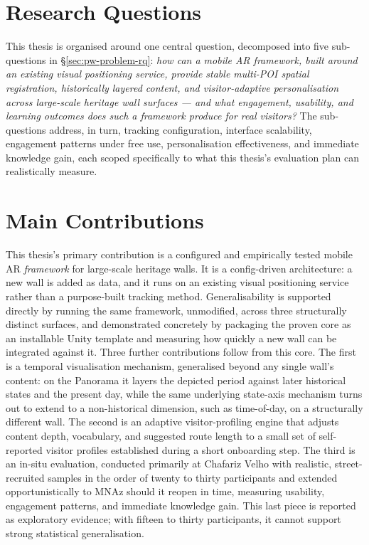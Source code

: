 \section{Research Questions}
\label{sec:intro-rqs}

This thesis is organised around one central question, decomposed into
five sub-questions in \S\ref{sec:pw-problem-rq}: \emph{how can a mobile
AR framework, built around an existing visual positioning service,
provide stable multi-POI spatial registration, historically layered
content, and visitor-adaptive personalisation across large-scale heritage
wall surfaces --- and what engagement, usability, and learning outcomes
does such a framework produce for real visitors?} The sub-questions
address, in turn, tracking configuration, interface scalability,
engagement patterns under free use, personalisation effectiveness, and
immediate knowledge gain, each scoped specifically to what this thesis's
evaluation plan can realistically measure.

\section{Main Contributions}
\label{sec:intro-contributions}

This thesis's primary contribution is a configured and empirically
tested mobile AR \emph{framework} for large-scale heritage walls. 
It is a config-driven architecture: a new wall is added as data, and it runs on an existing visual positioning service rather than a purpose-built tracking method.
Generalisability is supported directly by
running the same framework, unmodified, across three structurally
distinct surfaces, and demonstrated concretely by packaging the proven
core as an installable Unity template and measuring how quickly a new
wall can be integrated against it. Three further contributions follow
from this core. The first is a temporal visualisation mechanism,
generalised beyond any single wall's content: on the Panorama it layers
the depicted period against later historical states and the present
day, while the same underlying state-axis mechanism turns out to extend
to a non-historical dimension, such as time-of-day, on a structurally
different wall. The second is an adaptive visitor-profiling engine that
adjusts content depth, vocabulary, and suggested route length to a
small set of self-reported visitor profiles established during a short
onboarding step. The third is an in-situ evaluation, conducted
primarily at Chafariz Velho with realistic, street-recruited samples in
the order of twenty to thirty participants and extended opportunistically
to MNAz should it reopen in time, measuring usability, engagement
patterns, and immediate knowledge gain. This last piece is reported as
exploratory evidence; with fifteen to thirty participants, it cannot
support strong statistical generalisation.

